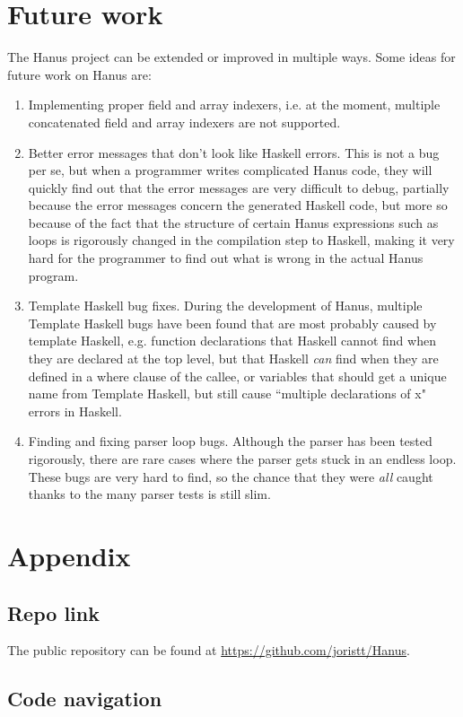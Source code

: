 \documentclass[12pt,a4paper]{article}
\begin{document}
\section{Future work}
	The Hanus project can be extended or improved in multiple ways. Some ideas for future work on Hanus are:
        \begin{enumerate}
                	\item Implementing proper field and array indexers, i.e. at the moment, multiple concatenated field and array indexers are not supported.
                	\item Better error messages that don't look like Haskell errors. This is not a bug per se, but when a programmer writes complicated Hanus code, they will quickly find out that the error messages are very difficult to debug, partially because the error messages concern the generated Haskell code, but more so because of the fact that the structure of certain Hanus expressions such as loops is rigorously changed in the compilation step to Haskell, making it very hard for the programmer to find out what is wrong in the actual Hanus program.
                	\item Template Haskell bug fixes. During the development of Hanus, multiple Template Haskell bugs have been found that are most probably caused by template Haskell, e.g. function declarations that Haskell cannot find when they are declared at the top level, but that Haskell \emph{can} find when they are defined in a where clause of the callee, or variables that should get a unique name from Template Haskell, but still cause ``multiple declarations of x" errors in Haskell.
                	\item Finding and fixing parser loop bugs. Although the parser has been tested rigorously, there are rare cases where the parser gets stuck in an endless loop. These bugs are very hard to find, so the chance that they were \emph{all} caught thanks to the many parser tests is still slim.
        \end{enumerate}

\section{Appendix}
    \subsection{Repo link}
    The public repository can be found at \url{https://github.com/joristt/Hanus}.
    \subsection{Code navigation}

\newpage


\end{document}
